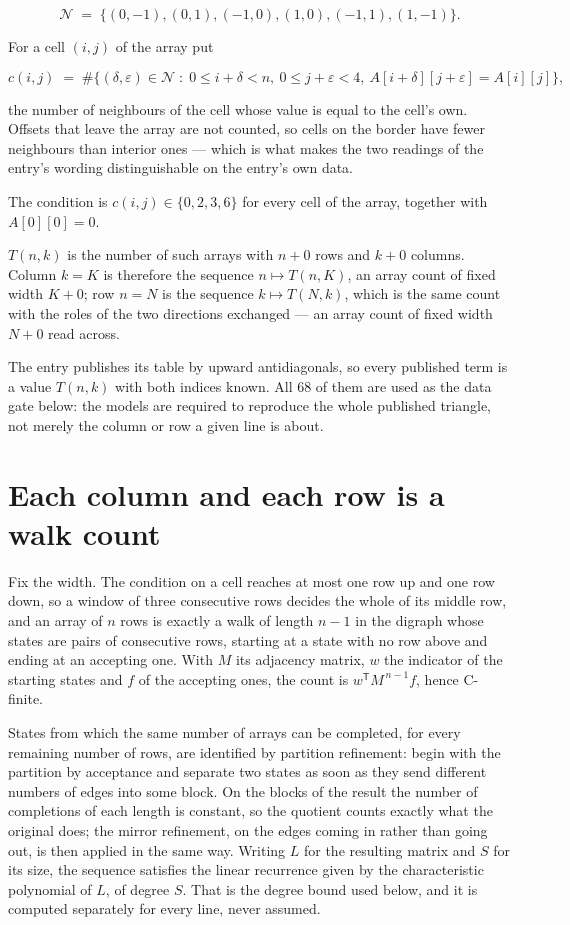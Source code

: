 \documentclass[11pt]{article}
\theoremstyle{definition}
\begin{document}
\[\mathcal{N} \;=\; \{(0,-1), (0,1), (-1,0), (1,0), (-1,1), (1,-1)\}.\]

For a cell $(i,j)$ of the array put

\[c(i,j) \;=\; \#\bigl\{(\delta,\varepsilon)\in\mathcal{N} \;:\; 0\le i+\delta<n,\ 0\le j+\varepsilon<4,\ A[i+\delta][j+\varepsilon] = A[i][j]\bigr\},\]

the number of neighbours of the cell whose value is equal to the cell's own. Offsets that leave the array are not counted, so cells on the border have fewer neighbours than interior ones --- which is what makes the two readings of the entry's wording distinguishable on the entry's own data.

The condition is $c(i,j) \in \{0, 2, 3, 6\}$ for every cell of the array, together with $A[0][0]=0$.

$T(n,k)$ is the number of such arrays with $n + 0$ rows and $k + 0$ columns. Column $k = K$ is therefore the sequence $n \mapsto T(n,K)$, an array count of fixed width $K + 0$; row $n = N$ is the sequence $k \mapsto T(N,k)$, which is the same count with the roles of the two directions exchanged --- an array count of fixed width $N + 0$ read across.

The entry publishes its table by upward antidiagonals, so every published term is a value $T(n,k)$ with both indices known. All 68 of them are used as the data gate below: the models are required to reproduce the whole published triangle, not merely the column or row a given line is about.

\section{Each column and each row is a walk count}

Fix the width. The condition on a cell reaches at most one row up and one row down, so a window of three consecutive rows decides the whole of its middle row, and an array of $n$ rows is exactly a walk of length $n-1$ in the digraph whose states are pairs of consecutive rows, starting at a state with no row above and ending at an accepting one. With $M$ its adjacency matrix, $w$ the indicator of the starting states and $f$ of the accepting ones, the count is $w^{\mathsf T}M^{\,n-1}f$, hence C-finite.

States from which the same number of arrays can be completed, for every remaining number of rows, are identified by partition refinement: begin with the partition by acceptance and separate two states as soon as they send different numbers of edges into some block. On the blocks of the result the number of completions of each length is constant, so the quotient counts exactly what the original does; the mirror refinement, on the edges coming in rather than going out, is then applied in the same way. Writing $L$ for the resulting matrix and $S$ for its size, the sequence satisfies the linear recurrence given by the characteristic polynomial of $L$, of degree $S$. That is the degree bound used below, and it is computed separately for every line, never assumed.
\end{document}
